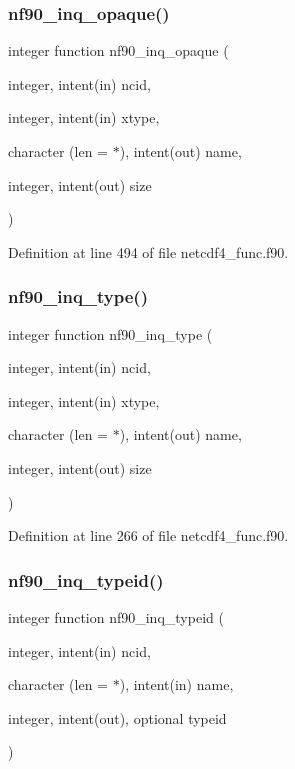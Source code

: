 \subsubsection{\texorpdfstring{nf90\+\_\+inq\+\_\+opaque()}{nf90\_inq\_opaque()}}
{\footnotesize\ttfamily integer function nf90\+\_\+inq\+\_\+opaque (\begin{DoxyParamCaption}\item[{integer, intent(in)}]{ncid,  }\item[{integer, intent(in)}]{xtype,  }\item[{character (len = $\ast$), intent(out)}]{name,  }\item[{integer, intent(out)}]{size }\end{DoxyParamCaption})}



Definition at line 494 of file netcdf4\+\_\+func.\+f90.

\mbox{\label{netcdf4__func_8f90_a92be7253c3e9244ba23d37863ccfedb1}} 
\subsubsection{\texorpdfstring{nf90\+\_\+inq\+\_\+type()}{nf90\_inq\_type()}}
{\footnotesize\ttfamily integer function nf90\+\_\+inq\+\_\+type (\begin{DoxyParamCaption}\item[{integer, intent(in)}]{ncid,  }\item[{integer, intent(in)}]{xtype,  }\item[{character (len = $\ast$), intent(out)}]{name,  }\item[{integer, intent(out)}]{size }\end{DoxyParamCaption})}



Definition at line 266 of file netcdf4\+\_\+func.\+f90.

\mbox{\label{netcdf4__func_8f90_a46fdff0d53554ba5693372dc94ce3227}} 
\subsubsection{\texorpdfstring{nf90\+\_\+inq\+\_\+typeid()}{nf90\_inq\_typeid()}}
{\footnotesize\ttfamily integer function nf90\+\_\+inq\+\_\+typeid (\begin{DoxyParamCaption}\item[{integer, intent(in)}]{ncid,  }\item[{character (len = $\ast$), intent(in)}]{name,  }\item[{integer, intent(out), optional}]{typeid }\end{DoxyParamCaption})}



